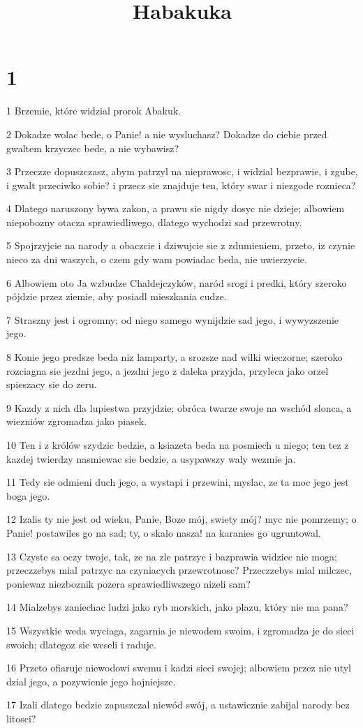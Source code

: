 

\title{Habakuka}


\chapter{1}

\par 1 Brzemie, które widzial prorok Abakuk.
\par 2 Dokadze wolac bede, o Panie! a nie wysluchasz? Dokadze do ciebie przed gwaltem krzyczec bede, a nie wybawisz?
\par 3 Przeczze dopuszczasz, abym patrzyl na nieprawosc, i widzial bezprawie, i zgube, i gwalt przeciwko sobie? i przecz sie znajduje ten, który swar i niezgode roznieca?
\par 4 Dlatego naruszony bywa zakon, a prawu sie nigdy dosyc nie dzieje; albowiem niepobozny otacza sprawiedliwego, dlatego wychodzi sad przewrotny.
\par 5 Spojrzyjcie na narody a obaczcie i dziwujcie sie z zdumieniem, przeto, iz czynie nieco za dni waszych, o czem gdy wam powiadac beda, nie uwierzycie.
\par 6 Albowiem oto Ja wzbudze Chaldejczyków, naród srogi i predki, który szeroko pójdzie przez ziemie, aby posiadl mieszkania cudze.
\par 7 Straszny jest i ogromny; od niego samego wynijdzie sad jego, i wywyzszenie jego.
\par 8 Konie jego predsze beda niz lamparty, a srozsze nad wilki wieczorne; szeroko rozciagna sie jezdni jego, a jezdni jego z daleka przyjda, przyleca jako orzel spieszacy sie do zeru.
\par 9 Kazdy z nich dla lupiestwa przyjdzie; obróca twarze swoje na wschód slonca, a wiezniów zgromadza jako piasek.
\par 10 Ten i z królów szydzic bedzie, a ksiazeta beda na posmiech u niego; ten tez z kazdej twierdzy nasmiewac sie bedzie, a usypawszy waly wezmie ja.
\par 11 Tedy sie odmieni duch jego, a wystapi i przewini, myslac, ze ta moc jego jest boga jego.
\par 12 Izalis ty nie jest od wieku, Panie, Boze mój, swiety mój? myc nie pomrzemy; o Panie! postawiles go na sad; ty, o skalo nasza! na karanies go ugruntowal.
\par 13 Czyste sa oczy twoje, tak, ze na zle patrzyc i bazprawia widziec nie moga; przeczzebys mial patrzyc na czyniacych przewrotnosc? Przeczzebys mial milczec, poniewaz niezboznik pozera sprawiedliwszego nizeli sam?
\par 14 Mialzebys zaniechac ludzi jako ryb morskich, jako plazu, który nie ma pana?
\par 15 Wszystkie weda wyciaga, zagarnia je niewodem swoim, i zgromadza je do sieci swoich; dlategoz sie weseli i raduje.
\par 16 Przeto ofiaruje niewodowi swemu i kadzi sieci swojej; albowiem przez nie utyl dzial jego, a pozywienie jego hojniejsze.
\par 17 Izali dlatego bedzie zapuszczal niewód swój, a ustawicznie zabijal narody bez litosci?

